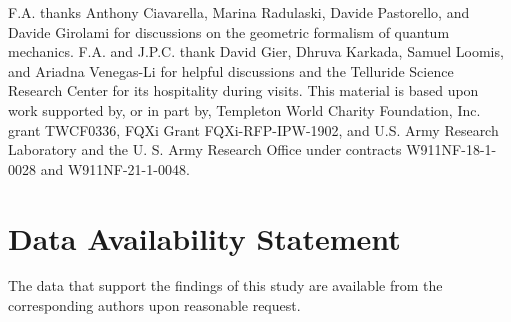 \documentclass[draft,nofootinbib,pre,twocolumn,showpacs,showkeys,groupaddress,preprintnumbers,floatfix]{revtex4-1}
\newcommand{\1}{\mathbbm{1}}
\begin{document}
F.A. thanks Anthony Ciavarella, Marina Radulaski, Davide Pastorello, and
Davide Girolami for discussions on the geometric formalism of quantum
mechanics. F.A. and J.P.C. thank David Gier, Dhruva Karkada, Samuel Loomis,
and Ariadna Venegas-Li for helpful discussions and the Telluride Science
Research Center for its hospitality during visits. This material is based upon
work supported by, or in part by, Templeton World Charity Foundation, Inc. grant TWCF0336, 
FQXi Grant FQXi-RFP-IPW-1902, and U.S. Army Research Laboratory and the U. S. Army 
Research Office under contracts W911NF-18-1-0028 and W911NF-21-1-0048.

\section*{Data Availability Statement}
The data that support the findings of this study are available from the
corresponding authors upon reasonable request.

% 
% 
% 
\end{document}
